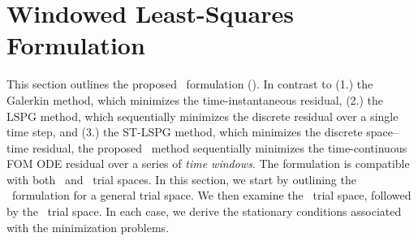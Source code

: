 \section{Windowed Least-Squares Formulation}\label{sec:tclspg} This section
outlines the proposed \methodName\ 
formulation (\methodAcronym). In contrast to (1.) the Galerkin method, which minimizes the 
time-instantaneous residual, (2.) the LSPG method, which sequentially minimizes the discrete 
residual over a single time step, and (3.) the ST-LSPG method, which minimizes the discrete 
space--time residual, the proposed \methodAcronym\ method sequentially minimizes the 
time-continuous FOM ODE residual over a series of
\textit{time windows}. The formulation is compatible with both \spatialAcronym\ and \spaceTimeAcronym\ trial spaces. 
In this section, we start by outlining the \methodAcronym\ formulation  
for a general trial space. We then examine the \spatialAcronym\ 
trial space, followed by the \spaceTimeAcronym\ trial space. In each case, we derive the stationary conditions 
associated with the minimization problems.

%
